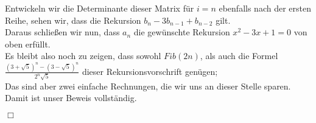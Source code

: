 Entwickeln wir die Determinante dieser Matrix für $i=n$ ebenfalls nach der ersten Reihe, sehen wir, dass die Rekursion $b_n-3b_{n-1} + b_{n-2}$ gilt.\\
Daraus schließen wir nun, dass $a_n$ die gewünschte Rekursion $x^2-3x+1=0$ von oben erfüllt.\\
Es bleibt also noch zu zeigen, dass sowohl $Fib(2n)$, als auch die Formel $\frac{(3+\sqrt{5})^{n}-(3-\sqrt{5})^{n}}{2^{n}\sqrt{5}}$ dieser Rekursionsvorschrift genügen;\\ 
Das sind aber zwei einfache Rechnungen, die wir uns an dieser Stelle sparen.\\
Damit ist unser Beweis vollständig.
\begin{flushright} $\Box$ \end{flushright}
